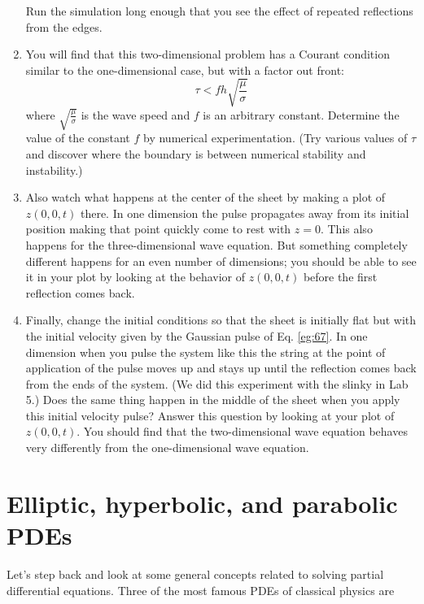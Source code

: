 \documentclass{book}
\theoremstyle{plain}
\theoremstyle{definition}
\numberwithin{exm}{chapter}
\theoremstyle{remark}
\theoremstyle{summary}
\theoremstyle{overview}
\begin{document}
\begin{enumerate}[label=(\alph*)]
Run the simulation long enough that you see the effect of repeated
reflections from the edges.
\item You will find that this two-dimensional problem has a Courant condition similar to the one-dimensional case, but with a factor out front:
\begin{equation}\label{eq:68}
\tau < fh \sqrt{\frac{\mu}{\sigma}}
\end{equation}
where $\sqrt{\frac{\mu}{\sigma}}$ is the wave speed and $f$ is an arbitrary constant. Determine the value of the constant $f$ by numerical experimentation.
(Try various values of $\tau$ and discover where the boundary is between
numerical stability and instability.)
\item Also watch what happens at the center of the sheet by making a plot
of $z(0,0,t)$ there. In one dimension the pulse propagates away from
its initial position making that point quickly come to rest with $z = 0$.
This also happens for the three-dimensional wave equation. But
something completely different happens for an even number of dimensions; you should be able to see it in your plot by looking at the
behavior of $z(0,0,t)$ before the first reflection comes back.
\item Finally, change the initial conditions so that the sheet is initially flat
but with the initial velocity given by the Gaussian pulse of Eq. \eqref{eg:67}.
In one dimension when you pulse the system like this the string at
the point of application of the pulse moves up and stays up until
the reflection comes back from the ends of the system. (We did this
experiment with the slinky in Lab 5.) Does the same thing happen
in the middle of the sheet when you apply this initial velocity pulse?
Answer this question by looking at your plot of $z(0,0,t)$. You should
find that the two-dimensional wave equation behaves very differently
from the one-dimensional wave equation.


\end{enumerate}
\section*{Elliptic, hyperbolic, and parabolic PDEs}

Let\rq s step back and look at some general concepts related to solving partial differential equations. Three of the most famous PDEs of classical physics are
\end{document}
